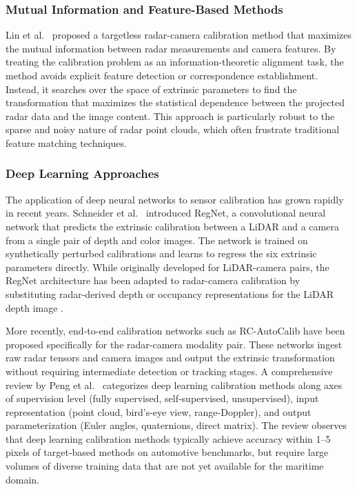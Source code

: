 \subsubsection{Mutual Information and Feature-Based Methods}

Lin et al.\ \cite{lin2024targetless} proposed a targetless radar-camera calibration method that maximizes the mutual information between radar measurements and camera features. By treating the calibration problem as an information-theoretic alignment task, the method avoids explicit feature detection or correspondence establishment. Instead, it searches over the space of extrinsic parameters to find the transformation that maximizes the statistical dependence between the projected radar data and the image content. This approach is particularly robust to the sparse and noisy nature of radar point clouds, which often frustrate traditional feature matching techniques.

\subsubsection{Deep Learning Approaches}

The application of deep neural networks to sensor calibration has grown rapidly in recent years. Schneider et al.\ \cite{schneider2017regnet} introduced RegNet, a convolutional neural network that predicts the extrinsic calibration between a LiDAR and a camera from a single pair of depth and color images. The network is trained on synthetically perturbed calibrations and learns to regress the six extrinsic parameters directly. While originally developed for LiDAR-camera pairs, the RegNet architecture has been adapted to radar-camera calibration by substituting radar-derived depth or occupancy representations for the LiDAR depth image \cite{peng2024camera}.

More recently, end-to-end calibration networks such as RC-AutoCalib \cite{arXiv2025rcautocalib} have been proposed specifically for the radar-camera modality pair. These networks ingest raw radar tensors and camera images and output the extrinsic transformation without requiring intermediate detection or tracking stages. A comprehensive review by Peng et al.\ \cite{peng2024camera} categorizes deep learning calibration methods along axes of supervision level (fully supervised, self-supervised, unsupervised), input representation (point cloud, bird's-eye view, range-Doppler), and output parameterization (Euler angles, quaternions, direct matrix). The review observes that deep learning calibration methods typically achieve accuracy within 1--5 pixels of target-based methods on automotive benchmarks, but require large volumes of diverse training data that are not yet available for the maritime domain.

